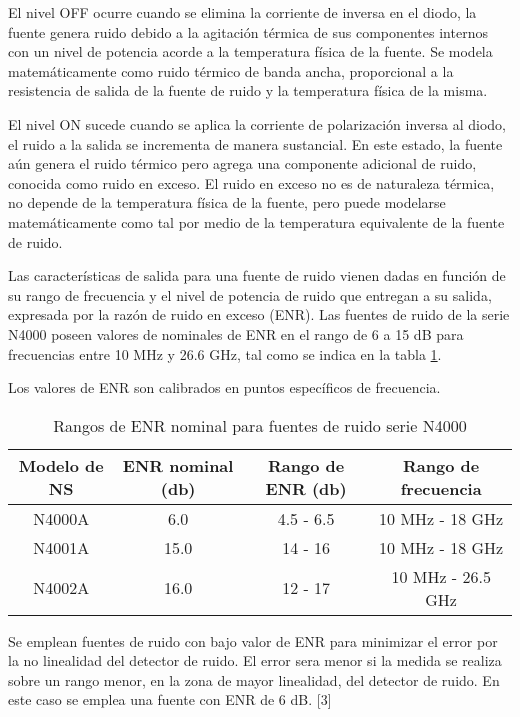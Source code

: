 	El nivel OFF ocurre cuando se elimina la corriente de inversa en el diodo, la fuente genera ruido debido a la agitación térmica de sus componentes internos con un nivel de potencia acorde a la temperatura física de la fuente. Se modela matemáticamente como ruido térmico de banda ancha, proporcional a la resistencia de salida de la fuente de ruido y la temperatura física de la misma. 
	
	El nivel ON sucede cuando se aplica la corriente de polarización inversa al diodo, el ruido a la salida se incrementa de manera sustancial. En este estado, la fuente aún genera el ruido térmico pero agrega una componente adicional de ruido, conocida como ruido en exceso. El ruido en exceso no es de naturaleza térmica, no depende de la temperatura física de la fuente, pero puede modelarse matemáticamente como tal por medio de la temperatura equivalente de la fuente de ruido.
	
	Las características de salida para una fuente de ruido vienen dadas en función de su rango de frecuencia y el nivel de potencia de ruido que entregan a su salida, expresada por la razón de ruido en exceso (ENR). Las fuentes de ruido de la serie N4000 poseen valores de nominales de ENR en el rango de 6 a 15 \si{\dB} para frecuencias entre 10 \si{\mega\hertz} y 26.6 \si{\giga\hertz}, tal como se indica en la tabla \ref{Tab:RangosFuentesRuido}.
	
	Los valores de ENR son calibrados en puntos específicos de frecuencia.
	
	\begin{table}[h!]
		\centering
		\begin{tabular}{cccc}
			\toprule
			Modelo de NS	&	ENR nominal (\si{\decibel})	& Rango de ENR (\si{\decibel})	&	Rango de frecuencia			\\
			\midrule	
			N4000A 	&	6.0	&	4.5 - 6.5	&	10 \si{\mega\hertz} - 18 \si{\giga\hertz} \\
			\midrule				
			N4001A 	&	15.0	&	14 - 16	&	10 \si{\mega\hertz} - 18 \si{\giga\hertz} \\
			\midrule	
			N4002A 	&	16.0	&	12 - 17	&	10 \si{\mega\hertz} - 26.5 \si{\giga\hertz} \\
			\bottomrule			
		\end{tabular}
		\caption{Rangos de ENR nominal para fuentes de ruido serie N4000}
		\label{Tab:RangosFuentesRuido}
	\end{table}
	
	Se emplean fuentes de ruido con bajo valor de ENR para minimizar el error por la no linealidad del detector de ruido. El error sera menor si la medida se realiza sobre un rango menor, en la zona de mayor linealidad, del detector de ruido. En este caso se emplea una fuente con ENR de 6 dB. [3]
	

